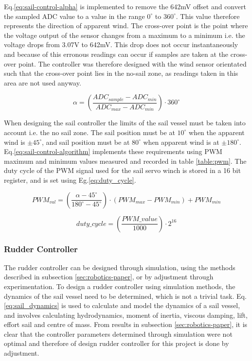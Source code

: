 Eq.\ref{eq:sail-control-alpha} is implemented to remove the 642mV offset and convert the sampled ADC value to a value in the range $0^{\circ}$ to $360^{\circ}$. This value therefore represents the
direction of apparent wind. The cross-over point is the point where the voltage output of the sensor changes from a maximum to a minimum i.e. the voltage drops from 3.07V to 642mV. This drop does 
not occur instantaneously and because of this erronous readings can occur if samples are taken at the cross-over point. The controller was therefore designed with the wind sensor orientated such that 
the cross-over point lies in the no-sail zone, as readings taken in this area are not used anyway.


\begin{equation}
    \label{eq:sail-control-alpha}
    \alpha = \left( \frac{ADC_{sample} - ADC_{min}}{ADC_{max} - ADC_{min}} \right) \cdot 360^{\circ}
\end{equation}


When designing the sail controller the limits of the sail vessel must be taken into account i.e. the no sail zone. The sail position must be at $10^{\circ}$ when the apparent wind is $\pm 45^{\circ}$,
and sail position must be at $80^{\circ}$ when apparent wind is at $\pm 180^{\circ}$. Eq.\ref{eq:sail-control-algorithm} implements these requirements using PWM maximum and minimum values measured and recorded in table
\ref{table:pwm}. The duty cycle of the PWM signal used for the sail servo winch is stored in a 16 bit register, and is set using Eg.\ref{eq:duty_cycle}.

\begin{equation}
    \label{eq:sail-control-algorithm}
    PWM_{val} = \left( \frac{\alpha - 45^{\circ}}{180^{\circ} - 45^{\circ}} \right) \cdot \left( PWM_{max} - PWM_{min}\right) + PWM_{min}
\end{equation}

\begin{equation}
    \label{eq:duty_cycle}
    duty\_cycle = \left(\frac{PWM\_value}{1000}\right) \cdot 2^{16}
\end{equation}


\subsubsection{Rudder Controller}
The rudder controller can be designed through simulation, using the methods described in subsection \ref{sec:robotics-paper}, or by adjustment through experimentation. To design a rudder 
controller using simulation methods, the dynamics of the sail vessel need to be determined, which is not a trivial task. Eq.\ref{eq:sail_dynamics} is used to calculate and model the dynamics 
of a sail vessel, and involves calculating hydrodynamics, moment of inertia, viscous damping, lift, effort sail and centre of mass. From results in subsection \ref{sec:robotics-paper}, 
it is clear that the controller parameters determined through simulation were not optimal and therefore of design rudder controller for this project is done by adjustment.

